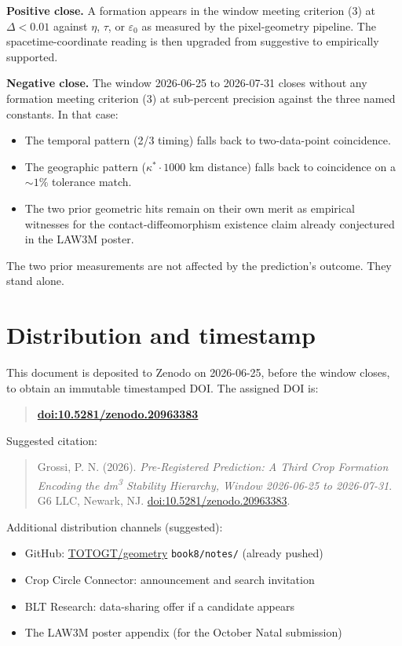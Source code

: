\documentclass[11pt,a4paper]{article}
\begin{document}
\textbf{Positive close.} A formation appears in the window meeting criterion (3) at $\Delta < 0.01$ against $\eta$, $\tau$, or $\varepsilon_0$ as measured by the pixel-geometry pipeline. The spacetime-coordinate reading is then upgraded from suggestive to empirically supported.

\textbf{Negative close.} The window 2026-06-25 to 2026-07-31 closes without any formation meeting criterion (3) at sub-percent precision against the three named constants. In that case:
\begin{itemize}
  \item The temporal pattern (2/3 timing) falls back to two-data-point coincidence.
  \item The geographic pattern ($\kappa^* \cdot 1000$ km distance) falls back to coincidence on a $\sim 1\%$ tolerance match.
  \item The two prior geometric hits remain on their own merit as empirical witnesses for the contact-diffeomorphism existence claim already conjectured in the LAW3M poster.
\end{itemize}

The two prior measurements are not affected by the prediction's outcome. They stand alone.

\section{Distribution and timestamp}

This document is deposited to Zenodo on 2026-06-25, before the window closes, to obtain an immutable timestamped DOI. The assigned DOI is:
\begin{quote}
\centering
\href{https://doi.org/10.5281/zenodo.20963383}{\textbf{doi:10.5281/zenodo.20963383}}
\end{quote}
Suggested citation:
\begin{quote}
\small
Grossi, P. N. (2026). \textit{Pre-Registered Prediction: A Third Crop Formation Encoding the dm\textsuperscript{3} Stability Hierarchy, Window 2026-06-25 to 2026-07-31}. G6 LLC, Newark, NJ. \href{https://doi.org/10.5281/zenodo.20963383}{doi:10.5281/zenodo.20963383}.
\end{quote}

Additional distribution channels (suggested):
\begin{itemize}
  \item GitHub: \href{https://github.com/TOTOGT/geometry}{TOTOGT/geometry} \texttt{book8/notes/} (already pushed)
  \item Crop Circle Connector: announcement and search invitation
  \item BLT Research: data-sharing offer if a candidate appears
  \item The LAW3M poster appendix (for the October Natal submission)
\end{itemize}
\end{document}
